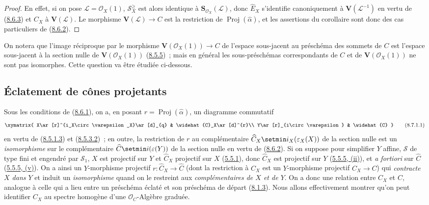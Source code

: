 \begin{proof}
En effet, si on pose $\mathcal{L}=\mathcal{O}_X(1)$,
$\mathcal{S}_X^{\geq}$ est alors identique à
$\mathbf{S}_{\mathcal{O}_X}(\mathcal{L})$, donc $\widehat{E}_X$ s'identifie
canoniquement à $\mathbf{V}(\mathcal{L}^{-1})$ en vertu de
(\hyperref[II.8.6.3-fr]{8.6.3}) et $C_X$ à $\mathbf{V}(\mathcal{L})$. Le
morphisme $\mathbf{V}(\mathcal{L})\to C$ est la restriction de
$\operatorname{Proj}(\widehat{\alpha})$, et les assertions du corollaire sont
donc des cas particuliers de (\hyperref[II.8.6.2-fr]{8.6.2}).
\end{proof}

On notera que l'image réciproque par le morphisme
$\mathbf{V}(\mathcal{O}_X(1))\to C$ de l'espace sous-jacent au préschéma des
sommets de $C$ est l'espace sous-jacent à la section nulle de
$\mathbf{V}(\mathcal{O}_X(1))$ (\hyperref[II.8.5.5-fr]{8.5.5})~; mais en
général les sous-préschémas correspondants de $C$ et de
$\mathbf{V}(\mathcal{O}_X(1))$ ne sont pas isomorphes. Cette question va être
étudiée ci-dessous.

\subsection{Éclatement de cônes projetants}
\label{subsection:II.8.7-fr}

\begin{env}[8.7.1]
\label{II.8.7.1-fr}
Sous les conditions de (\hyperref[II.8.6.1-fr]{8.6.1}), on a, en posant
$r=\operatorname{Proj}(\widehat{\alpha})$, un diagramme commutatif
\begin{equation}
\label{II.8.7.1.1-fr}
  \xymatrix{
    X\ar[r]^{i_X\circ\varepsilon_X}\ar[d]_{q} &
    \widehat{C}_X\ar[d]^{r}\\
    Y\ar[r]_{i\circ\varepsilon} & \widehat{C}
  }
\tag{8.7.1.1}
\end{equation}
en vertu de (\hyperref[II.8.5.1.3-fr]{8.5.1.3}) et
(\hyperref[II.8.5.3.2-fr]{8.5.3.2})~; en outre, la restriction de $r$ au
complémentaire $\widehat{C}_X\setmin i_X(\varepsilon_X(X))$ de la section nulle est
un \emph{isomorphisme} sur le complémentaire
$\widehat{C}\setmin i(\varepsilon(Y))$ de la section nulle en vertu de
(\hyperref[II.8.6.2-fr]{8.6.2}). Si on suppose pour simplifier $Y$ affine,
$\mathcal{S}$ de type fini et engendré par $\mathcal{S}_1$, $X$ est projectif
sur $Y$ et $\widehat{C}_X$ projectif sur $X$
(\hyperref[II.5.5.1-fr]{5.5.1}), donc $\widehat{C}_X$ est projectif sur $Y$
(\hyperref[II.5.5.5-fr]{5.5.5, (ii)}), et \emph{a fortiori} sur
$\widehat{C}$ (\hyperref[II.5.5.5-fr]{5.5.5, (v)}). On a ainsi un
$Y$-morphisme projectif $r:\widehat{C}_X\to\widehat{C}$ (dont la restriction
à $C_X$ est un $Y$-morphisme projectif $C_X\to C$) qui \emph{contracte $X$
dans $Y$} et induit un \emph{isomorphisme} quand on le restreint aux
\emph{complémentaires de $X$ et de $Y$}. On a donc une relation entre $C_X$
et $C$, analogue à celle qui a lieu entre un préschéma éclaté et son préschéma
de départ (\hyperref[II.8.1.3-fr]{8.1.3}). Nous allons effectivement montrer
qu'on peut identifier $C_X$ au spectre homogène d'une
$\mathcal{O}_C$-Algèbre graduée.
\end{env}

